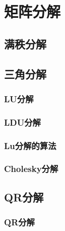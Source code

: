 \chapter{矩阵分解}
\label{cha:矩阵分解}

\section{满秩分解}
\label{sec:满秩分解}

\begin{definition}
\end{definition}

\section{三角分解}
\label{sec:三角分解}

\subsection{LU分解}
\label{sub:LU分解}

\begin{definition}
\end{definition}

\subsection{LDU分解}
\label{sub:LDU分解}

\begin{definition}
\end{definition}

\subsection{Lu分解的算法}
\label{sub:Lu分解的算法}

\subsection{Cholesky分解}
\label{sub:Cholesky分解}

\begin{definition}
\end{definition}

\section{QR分解}
\label{sec:QR分解}

\subsection{QR分解}
\label{sub:QR分解}

